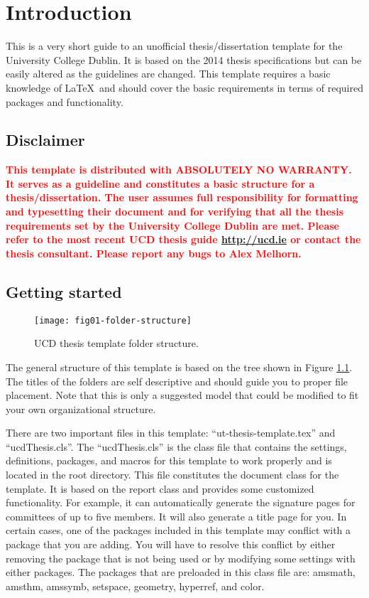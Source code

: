 \chapter{Introduction} \label{ch:introduction}

This is a very short guide to an unofficial thesis/dissertation template for the University College Dublin. It is based on the 2014 thesis specifications but can be easily altered as the guidelines are changed. This template requires a basic knowledge of \LaTeX\ and should cover the basic requirements in terms of required packages and functionality.

\section{Disclaimer}
\textcolor{red}{\bf
This template is distributed with ABSOLUTELY NO WARRANTY. It serves as a guideline and constitutes a basic structure for a thesis/dissertation. The user assumes full responsibility for formatting and typesetting their document and for verifying that all the thesis requirements set by the University College Dublin are met. Please refer to the most recent UCD thesis guide \href{http://ucd.ie}{http://ucd.ie} or contact the thesis consultant. Please report any bugs to Alex Melhorn.}

\section{Getting started}
\begin{figure}[b!]
  \centering
  \texttt{[image: fig01-folder-structure]}\\
  \caption{UCD thesis template folder structure.}\label{fig:intro-folder-structure}
\end{figure}
The general structure of this template is based on the tree shown in Figure \ref{fig:intro-folder-structure}. The titles of the folders are self descriptive and should guide you to proper file placement. Note that this is only a suggested model that could be modified to fit your own organizational structure.

There are two important files in this template: ``ut-thesis-template.tex'' and ``ucdThesis.cls''. The ``ucdThesis.cls'' is the class file that contains the settings, definitions, packages, and macros for this template to work properly and is located in the root directory. This file constitutes the document class for the template. It is based on the report class and provides some customized functionality. For example, it can automatically generate the signature pages for committees of up to five members. It will also generate a title page for you. In certain cases, one of the packages included in this template may conflict with a package that you are adding. You will have to resolve this conflict by either removing the package that is not being used or by modifying some settings with either packages. The packages that are preloaded in this class file are: amsmath, amsthm, amssymb, setspace, geometry, hyperref, and color.

